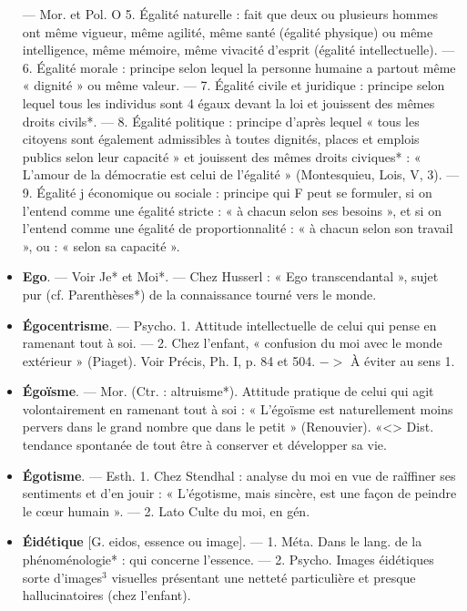 \begin{itemize}[leftmargin=1cm, label=, itemsep=1pt]
— Mor. et Pol. O 5. Égalité naturelle : fait que deux ou plusieurs
hommes ont même vigueur, même
agilité, même santé (égalité physique) ou même intelligence, même
mémoire, même vivacité d'esprit
(égalité intellectuelle). — 6. Égalité
morale : principe selon lequel la
personne humaine a partout même
« dignité » ou même valeur. — 7.
Égalité civile et juridique : principe
selon lequel tous les individus sont
4 égaux devant la loi et jouissent des
mêmes droits civils*. — 8. Égalité
politique : principe d’après lequel
« tous les citoyens sont également
admissibles à toutes dignités, places
et emplois publics selon leur capacité » et jouissent des mêmes droits
civiques* : « L'amour de la démocratie est celui de l'égalité » (Montesquieu, Lois, V, 3). — 9. Égalité
j économique ou sociale : principe qui
F peut se formuler, si on l'entend
comme une égalité stricte : « à
chacun selon ses besoins », et si on
l'entend comme une égalité de proportionnalité : « à chacun selon son
travail », ou : « selon sa capacité ».

\item {\bf Ego}. — Voir Je* et Moi*. — Chez
Husserl : « Ego transcendantal »,
sujet pur (cf. Parenthèses*) de la
connaissance tourné vers le monde.

\item {\bf Égocentrisme}. — Psycho. 1. Attitude
intellectuelle de celui qui pense
en ramenant tout à soi. — 2. Chez
l'enfant, « confusion du moi avec le
monde extérieur » (Piaget). Voir
Précis, Ph. I, p. 84 et 504. $->$ À
éviter au sens 1.

\item {\bf Égoïsme}. — Mor. (Ctr. : altruisme*).
Attitude pratique de celui qui agit
volontairement en ramenant tout à
soi : « L’égoïsme est naturellement
moins pervers dans le grand nombre
que dans le petit » (Renouvier).
«<> Dist. tendance spontanée de
tout être à conserver et développer
sa vie.

\item {\bf Égotisme}. — Esth. 1. Chez Stendhal :
analyse du moi en vue de raîffiner
ses sentiments et d'en jouir : « L’égotisme, mais sincère, est une façon de
peindre le cœur humain ». — 2. Lato
Culte du moi, en gén.

\item {\bf Éidétique} [G. eidos, essence ou image].
— 1. Méta. Dans le lang. de la phénoménologie* : qui concerne l'essence.
— 2. Psycho. Images éidétiques
sorte d'images$^3$ visuelles présentant
une netteté particulière et presque
hallucinatoires (chez l'enfant).


\end{itemize}
